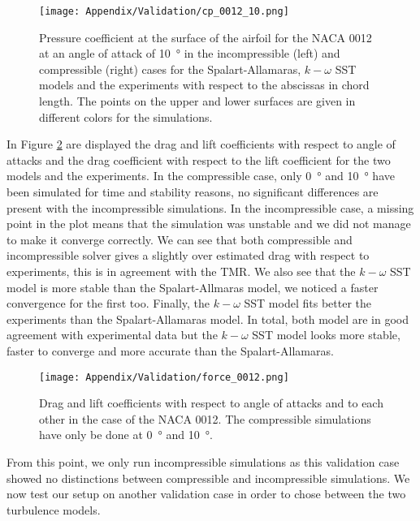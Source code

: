 \begin{subappendices}
	\begin{figure}
		\centering
		\texttt{[image: Appendix/Validation/cp\_0012\_10.png]}
		\caption{Pressure coefficient at the surface of the airfoil for the NACA 0012 at an angle of attack of \SI{10}{\degree} in the incompressible (left) and compressible (right) cases for the Spalart-Allamaras,  $k-\omega$ SST models and the experiments with respect to the abscissas in chord length. The points on the upper and lower surfaces are given in different colors for the simulations.}
		\label{fig:cp_0012_10}
	\end{figure}
	
	In Figure \ref{fig:force_0012} are displayed the drag and lift coefficients with respect to angle of attacks and the drag coefficient with respect to the lift coefficient for the two models and the experiments. In the compressible case, only \SI{0}{\degree} and \SI{10}{\degree} have been simulated for time and stability reasons, no significant differences are present with the incompressible simulations. In the incompressible case, a missing point in the plot means that the simulation was unstable and we did not manage to make it converge correctly. We can see that both compressible and incompressible solver gives a slightly over estimated drag with respect to experiments, this is in agreement with the TMR. We also see that the $k-\omega$ SST model is more stable than the Spalart-Allmaras model, we noticed a faster convergence for the first too. Finally, the $k-\omega$ SST model fits better the experiments than the Spalart-Allamaras model. In total, both model are in good agreement with experimental data but the $k-\omega$ SST model looks more stable, faster to converge and more accurate than the Spalart-Allamaras.
	
	\begin{figure}
		\centering
		\texttt{[image: Appendix/Validation/force\_0012.png]}
		\caption{Drag and lift coefficients with respect to angle of attacks and to each other in the case of the NACA 0012. The compressible simulations have only be done at \SI{0}{\degree} and \SI{10}{\degree}.}
		\label{fig:force_0012}
	\end{figure}
	
	From this point, we only run incompressible simulations as this validation case showed no distinctions between compressible and incompressible simulations. We now test our setup on another validation case in order to chose between the two turbulence models.
	

\end{subappendices}
